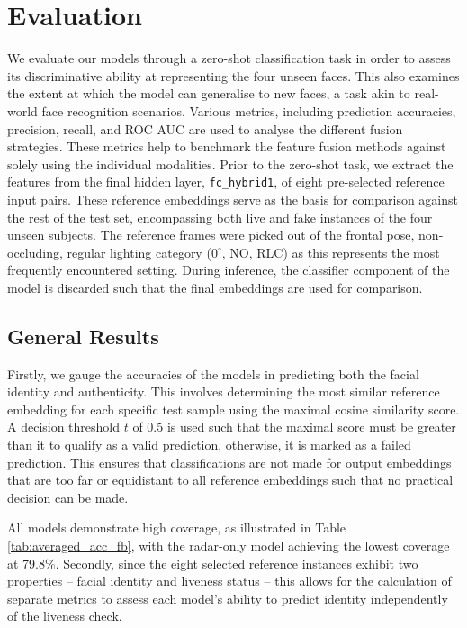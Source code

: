 \documentclass{mpaper}
\begin{document}
\section{Evaluation}
We evaluate our models through a zero-shot classification task in order to assess its discriminative ability at representing the four unseen faces. This also examines the extent at which the model can generalise to new faces, a task akin to real-world face recognition scenarios. Various metrics, including prediction accuracies, precision, recall, and ROC AUC are used to analyse the different fusion strategies. These metrics help to benchmark the feature fusion methods against solely using the individual modalities. Prior to the zero-shot task, we extract the features from the final hidden layer, \verb|fc_hybrid1|, of eight pre-selected reference input pairs. These reference embeddings serve as the basis for comparison against the rest of the test set, encompassing both live and fake instances of the four unseen subjects. The reference frames were picked out of the frontal pose, non-occluding, regular lighting category ($0^\circ , \, \text{NO}, \, \text{RLC}$) as this represents the most frequently encountered setting. During inference, the classifier component of the model is discarded such that the final embeddings are used for comparison. 


\subsection{General Results}
Firstly, we gauge the accuracies of the models in predicting both the facial identity and authenticity. This involves determining the most similar reference embedding for each specific test sample using the maximal cosine similarity score. A decision threshold $t$ of 0.5 is used such that the maximal score must be greater than it to qualify as a valid prediction, otherwise, it is marked as a failed prediction. This ensures that classifications are not made for output embeddings that are too far or equidistant to all reference embeddings such that no practical decision can be made. 

All models demonstrate high coverage, as illustrated in Table \ref{tab:averaged_acc_fb}, with the radar-only model achieving the lowest coverage at 79.8\%. Secondly, since the eight selected reference instances exhibit two properties -- facial identity and liveness status -- this allows for the calculation of separate metrics to assess each model's ability to predict identity independently of the liveness check.
\end{document}
